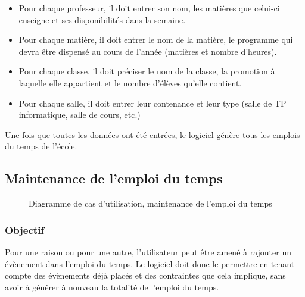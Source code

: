 \documentclass[12pt,a4paper,french]{article}
\begin{document}
\begin{itemize}
\item Pour chaque professeur, il doit entrer son nom, les matières que celui-ci enseigne et ses disponibilités dans la semaine. 
\item Pour chaque matière, il doit entrer le nom de la matière, le programme qui devra être dispensé au cours de l'année (matières et nombre d'heures).
\item Pour chaque classe, il doit préciser le nom de la classe, la promotion à laquelle elle appartient et le nombre d'élèves qu'elle contient.
\item Pour chaque salle, il doit entrer leur contenance et leur type (salle de TP informatique, salle de cours, etc.)
\end{itemize}
                    
Une fois que toutes les données ont été entrées, le logiciel génère tous les emplois du temps de l'école. 
        
\newpage
\subsection{Maintenance de l'emploi du temps}    
\begin{figure}[! ht ]
    \centering
    \begin{minipage}[t]{14 cm}
        \centering
        \caption {Diagramme de cas d'utilisation, maintenance de l'emploi du temps}
    \end{minipage}
\end{figure}
            
\subsubsection{Objectif}
Pour une raison ou pour une autre, l'utilisateur peut être amené à rajouter un évènement dans l'emploi du temps. Le logiciel doit donc le permettre en tenant  compte des évènements déjà placés et des contraintes que cela implique, sans avoir à générer à nouveau la totalité de l'emploi du temps. 
                
\end{document}
